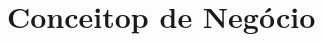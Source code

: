 \chapter{Conceitop de Negócio}
\label{chapter:Conceitop}


\begin{commentA}

\par \end{commentA}

\begin{commentB}
	
\par \end{commentB}







